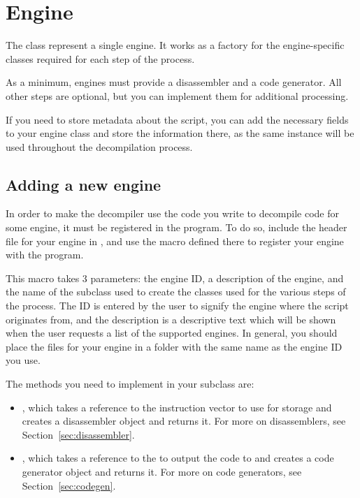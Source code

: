 \newpage\section{Engine}
The  class represent a single engine. It works as a factory for the engine-specific classes required for each step of the process.

As a minimum, engines must provide a disassembler and a code generator. All other steps are optional, but you can implement them for additional processing.

If you need to store metadata about the script, you can add the necessary fields to your engine class and store the information there, as the same instance will be used throughout the decompilation process.

\subsection{Adding a new engine}
In order to make the decompiler use the code you write to decompile code for some engine, it must be registered in the program. To do so, include the header file for your engine in , and use the  macro defined there to register your engine with the program.

This macro takes 3 parameters: the engine ID, a description of the engine, and the name of the  subclass used to create the classes used for the various steps of the process. The ID is entered by the user to signify the engine where the script originates from, and the description is a descriptive text which will be shown when the user requests a list of the supported engines. In general, you should place the files for your engine in a folder with the same name as the engine ID you use.

The methods you need to implement in your  subclass are:
\begin{itemize}
\item {}, which takes a reference to the instruction vector to use for storage and creates a disassembler object and returns it. For more on disassemblers, see Section~\vref{sec:disassembler}.
\item {}, which takes a reference to the  to output the code to and creates a code generator object and returns it. For more on code generators, see Section~\vref{sec:codegen}.
\end{itemize}

